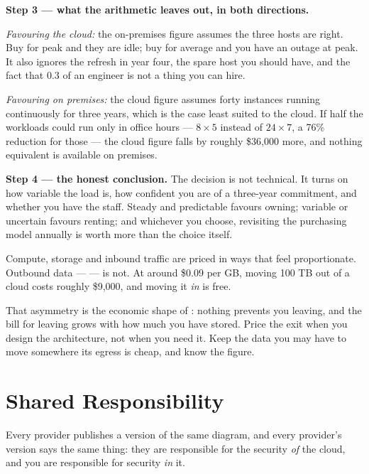 \begin{worked}
\smallskip
\textbf{Step 3 --- what the arithmetic leaves out, in both directions.}

\emph{Favouring the cloud:} the on-premises figure assumes the three hosts are
right. Buy for peak and they are idle; buy for average and you have an outage
at peak. It also ignores the refresh in year four, the spare host you should
have, and the fact that 0.3 of an engineer is not a thing you can hire.

\emph{Favouring on premises:} the cloud figure assumes forty instances running
continuously for three years, which is the case least suited to the cloud. If
half the workloads could run only in office hours --- $8 \times 5$ instead of
$24 \times 7$, a 76\% reduction for those --- the cloud figure falls by roughly
\$36{,}000 more, and nothing equivalent is available on premises.

\smallskip
\textbf{Step 4 --- the honest conclusion.} The decision is not technical. It
turns on how variable the load is, how confident you are of a three-year
commitment, and whether you have the staff. Steady and predictable favours
owning; variable or uncertain favours renting; and whichever you choose,
revisiting the purchasing model annually is worth more than the choice itself.
\end{worked}

\begin{alertbox}
Compute, storage and inbound traffic are priced in ways that feel proportionate.
Outbound data ---  --- is not. At around \$0.09 per GB, moving
100 TB out of a cloud costs roughly \$9{,}000, and moving it \emph{in} is free.

\smallskip
That asymmetry is the economic shape of : nothing prevents you
leaving, and the bill for leaving grows with how much you have stored. Price
the exit when you design the architecture, not when you need it. Keep the data
you may have to move somewhere its egress is cheap, and know the figure.
\end{alertbox}

\section{Shared Responsibility}

Every provider publishes a version of the same diagram, and every provider's
version says the same thing: they are responsible for the security \emph{of}
the cloud, and you are responsible for security \emph{in} it.

